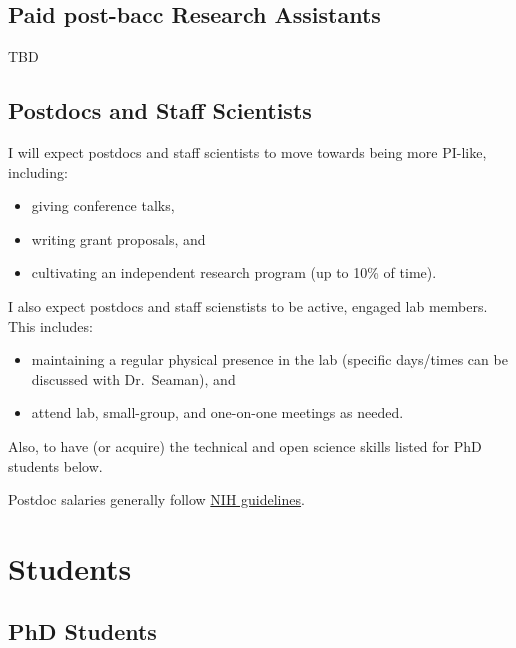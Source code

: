 \documentclass[]{book}
\providecommand{\tightlist}{%
  \setlength{\itemsep}{0pt}\setlength{\parskip}{0pt}}
\begin{document}
\hypertarget{paid-post-bacc-research-assistants}{%
\subsection{Paid post-bacc Research Assistants}\label{paid-post-bacc-research-assistants}}

TBD

\hypertarget{postdocs-and-staff-scientists}{%
\subsection{Postdocs and Staff Scientists}\label{postdocs-and-staff-scientists}}

I will expect postdocs and staff scientists to move towards being more PI-like, including:

\begin{itemize}
\tightlist
\item
  giving conference talks,\\
\item
  writing grant proposals, and\\
\item
  cultivating an independent research program (up to 10\% of time).
\end{itemize}

I also expect postdocs and staff scienstists to be active, engaged lab members. This includes:

\begin{itemize}
\tightlist
\item
  maintaining a regular physical presence in the lab (specific days/times can be discussed with Dr.~Seaman), and
\item
  attend lab, small-group, and one-on-one meetings as needed.
\end{itemize}

Also, to have (or acquire) the technical and open science skills listed for PhD students below.

Postdoc salaries generally follow \href{https://www.niaid.nih.gov/grants-contracts/salary-cap-and-stipend-levels-announced}{NIH guidelines}.

\hypertarget{students}{%
\section{Students}\label{students}}

\hypertarget{phd-students}{%
\subsection{PhD Students}\label{phd-students}}
\end{document}
